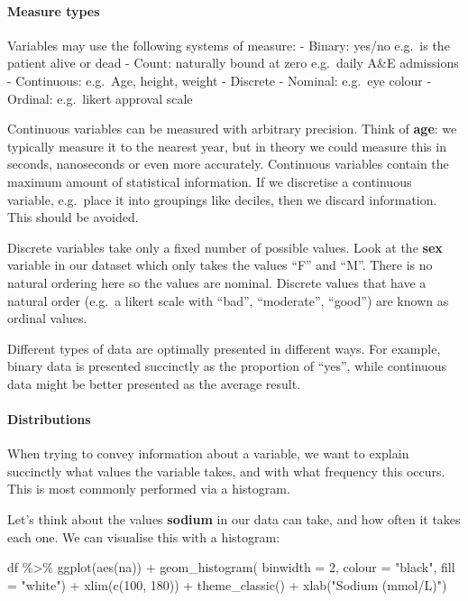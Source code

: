 \documentclass[
]{article}
\newenvironment{Shaded}{\begin{snugshade}}{\end{snugshade}}
\newcommand{\AttributeTok}[1]{\textcolor[rgb]{0.77,0.63,0.00}{#1}}
\newcommand{\DecValTok}[1]{\textcolor[rgb]{0.00,0.00,0.81}{#1}}
\newcommand{\FunctionTok}[1]{\textcolor[rgb]{0.00,0.00,0.00}{#1}}
\newcommand{\NormalTok}[1]{#1}
\newcommand{\SpecialCharTok}[1]{\textcolor[rgb]{0.00,0.00,0.00}{#1}}
\newcommand{\StringTok}[1]{\textcolor[rgb]{0.31,0.60,0.02}{#1}}
\begin{document}
\hypertarget{measure-types}{%
\paragraph{Measure types}\label{measure-types}}

Variables may use the following systems of measure: - Binary: yes/no
e.g.~is the patient alive or dead - Count: naturally bound at zero
e.g.~daily A\&E admissions - Continuous: e.g.~Age, height, weight -
Discrete - Nominal: e.g.~eye colour - Ordinal: e.g.~likert approval
scale

Continuous variables can be measured with arbitrary precision. Think of
\textbf{age}: we typically measure it to the nearest year, but in theory
we could measure this in seconds, nanoseconds or even more accurately.
Continuous variables contain the maximum amount of statistical
information. If we discretise a continuous variable, e.g.~place it into
groupings like deciles, then we discard information. This should be
avoided.

Discrete variables take only a fixed number of possible values. Look at
the \textbf{sex} variable in our dataset which only takes the values
``F'' and ``M''. There is no natural ordering here so the values are
nominal. Discrete values that have a natural order (e.g.~a likert scale
with ``bad'', ``moderate'', ``good'') are known as ordinal values.

Different types of data are optimally presented in different ways. For
example, binary data is presented succinctly as the proportion of
``yes'', while continuous data might be better presented as the average
result.

\hypertarget{distributions}{%
\paragraph{Distributions}\label{distributions}}

When trying to convey information about a variable, we want to explain
succinctly what values the variable takes, and with what frequency this
occurs. This is most commonly performed via a histogram.

Let's think about the values \textbf{sodium} in our data can take, and
how often it takes each one. We can visualise this with a histogram:

\begin{Shaded}
\begin{Highlighting}[]
\NormalTok{df }\SpecialCharTok{\%\textgreater{}\%}
  \FunctionTok{ggplot}\NormalTok{(}\FunctionTok{aes}\NormalTok{(na)) }\SpecialCharTok{+}
  \FunctionTok{geom\_histogram}\NormalTok{(}
    \AttributeTok{binwidth =} \DecValTok{2}\NormalTok{,}
    \AttributeTok{colour =} \StringTok{"black"}\NormalTok{,}
    \AttributeTok{fill =} \StringTok{"white"}\NormalTok{) }\SpecialCharTok{+}
  \FunctionTok{xlim}\NormalTok{(}\FunctionTok{c}\NormalTok{(}\DecValTok{100}\NormalTok{, }\DecValTok{180}\NormalTok{)) }\SpecialCharTok{+}
  \FunctionTok{theme\_classic}\NormalTok{() }\SpecialCharTok{+}
  \FunctionTok{xlab}\NormalTok{(}\StringTok{"Sodium (mmol/L)"}\NormalTok{)}
\end{Highlighting}
\end{Shaded}
\end{document}
